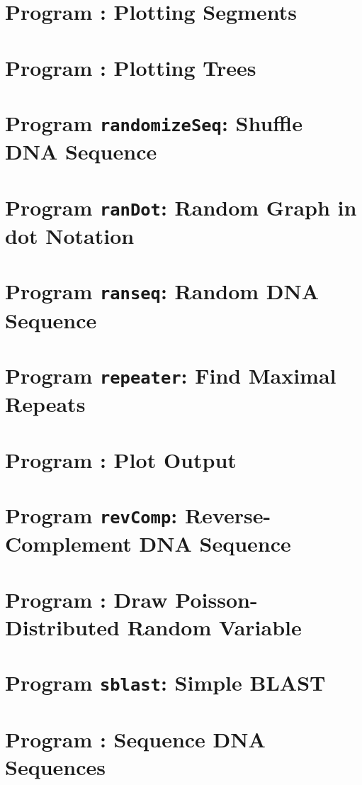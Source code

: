 \documentclass[a4paper]{report}
\begin{document}
\chapter{Program : Plotting Segments}\label{ch:ps}

\chapter{Program : Plotting Trees}\label{ch:pt}

\chapter{Program \texttt{randomizeSeq}: Shuffle DNA
  Sequence}\label{ch:rs}

\chapter{Program \texttt{ranDot}: Random Graph in dot Notation}\label{ch:rd}

\chapter{Program \texttt{ranseq}: Random DNA Sequence}\label{ch:ran}

\chapter{Program \texttt{repeater}: Find Maximal
  Repeats}\label{ch:rep}

\chapter{Program : Plot 
  Output}\label{ch:r2p}

\chapter{Program \texttt{revComp}: Reverse-Complement DNA
  Sequence}\label{ch:rev}

\chapter{Program : Draw Poisson-Distributed Random
  Variable}\label{ch:rpo}

\chapter{Program \texttt{sblast}: Simple BLAST}\label{ch:sb}

\chapter{Program : Sequence DNA Sequences}\label{ch:seq}

\end{document}
